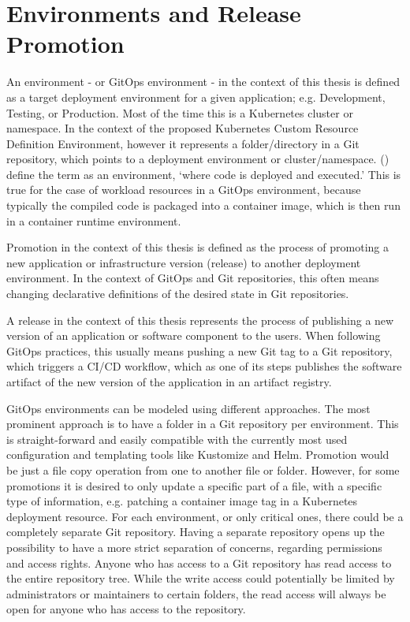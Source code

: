 \section{Environments and Release Promotion}

An environment
- or GitOps environment -
in the context of this thesis
is defined as a target deployment environment for a given application;
e.g. Development, Testing, or Production.
Most of the time this is a Kubernetes cluster or namespace.
In the context of the proposed Kubernetes Custom Resource Definition
Environment, however it represents a folder/directory in a Git repository,
which points to a deployment environment or cluster/namespace.
%
\citeauthor{gitopsAndKubernetes2021continuous} (\citeyear{gitopsAndKubernetes2021continuous})
define the term as an environment, \enquote*{where code is deployed and executed.}
\autocite{gitopsAndKubernetes2021continuous}
This is true for the case of workload resources in a GitOps environment,
because typically the compiled code is packaged into a container image,
which is then run in a container runtime environment.

Promotion in the context of this thesis is defined as
the process of promoting a new application or infrastructure version (release)
to another deployment environment.
In the context of GitOps and Git repositories,
this often means changing declarative definitions of the desired state in Git repositories.

A release in the context of this thesis
represents the process of
publishing a new version of an application or software component
to the users.
When following GitOps practices,
this usually means
pushing a new Git tag to a Git repository,
which triggers a CI/CD workflow,
which as one of its steps publishes the software artifact of
the new version of the application in an artifact registry.

GitOps environments can be modeled using different approaches.
The most prominent approach is to have a folder in a Git repository
per environment. This is straight-forward and easily compatible with
the currently most used configuration and templating tools like Kustomize and Helm.
Promotion would be just a file copy operation from one to another file or folder.
However, for some promotions it is desired to only update a specific part of a file,
with a specific type of information, e.g. patching a container image tag in a Kubernetes
deployment resource.
For each environment, or only critical ones, there could be a completely separate Git repository.
Having a separate repository opens up the possibility to have a more strict separation of concerns,
regarding permissions and access rights.
Anyone who has access to a Git repository has read access to the entire repository tree.
While the write access could potentially be limited by administrators or maintainers
to certain folders, the read access will always be open for anyone who has access to the repository.

